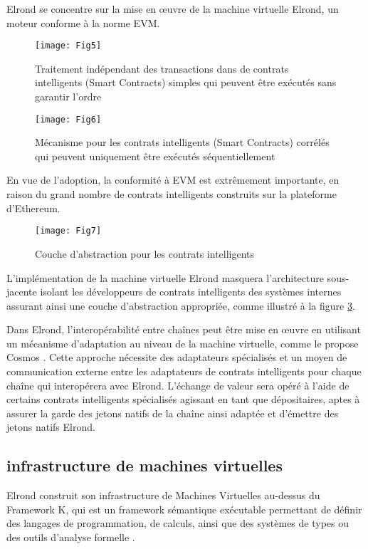 \documentclass[journal]{IEEEtran}
\begin{document}
Elrond se concentre sur la mise en œuvre de la machine virtuelle Elrond, un moteur conforme à la norme EVM. 

\begin{figure}[h]
	\texttt{[image: Fig5]} %
	\caption{Traitement indépendant des transactions dans de contrats intelligents (Smart Contracts) simples qui peuvent être exécutés sans garantir l'ordre} %
	\label{Fig.5} %
\end{figure}

\begin{figure}[h]
	\texttt{[image: Fig6]} %
	\caption{Mécanisme pour les contrats intelligents (Smart Contracts) corrélés qui peuvent uniquement être exécutés séquentiellement} %
	\label{Fig.6} %
\end{figure}

En vue de l'adoption, la conformité à EVM est extrêmement importante, en raison du grand nombre de contrats intelligents construits sur la plateforme d'Ethereum.

\begin{figure}[h]
	\texttt{[image: Fig7]} %
	\caption{Couche d'abstraction pour les contrats intelligents} %
	\label{Fig.7} %
\end{figure}

L'implémentation de la machine virtuelle Elrond masquera l'architecture sous-jacente isolant les développeurs de contrats intelligents des systèmes internes assurant ainsi une couche d'abstraction appropriée, comme illustré à la figure  \ref{Fig.7}.

Dans Elrond, l'interopérabilité entre chaînes peut être mise en œuvre en utilisant un mécanisme d'adaptation au niveau de la machine virtuelle, comme le propose Cosmos \cite{38}. Cette approche nécessite des adaptateurs spécialisés et un moyen de communication externe entre les adaptateurs de contrats intelligents pour chaque chaîne qui interopérera avec Elrond. L'échange de valeur sera opéré à l'aide de certains contrats intelligents spécialisés agissant en tant que dépositaires, aptes à assurer la garde des jetons natifs de la chaîne ainsi adaptée et d'émettre des jetons natifs Elrond.

\subsection{infrastructure de machines virtuelles}
Elrond construit son infrastructure de Machines Virtuelles au-dessus du Framework K, qui est un framework sémantique exécutable permettant de définir des langages de programmation, de calculs, ainsi que des systèmes de types ou des outils d'analyse formelle \cite{39}.
\end{document}
